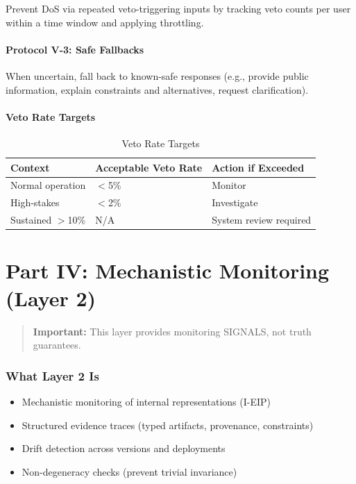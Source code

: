 \documentclass[11pt,letterpaper]{article}
\theoremstyle{definition}
\theoremstyle{remark}
\begin{document}
Prevent DoS via repeated veto-triggering inputs by tracking veto counts per user within a time window and applying throttling.

\subsection{Protocol V-3: Safe Fallbacks}

When uncertain, fall back to known-safe responses (e.g., provide public information, explain constraints and alternatives, request clarification).

\subsection{Veto Rate Targets}

\begin{table}[h]
\centering
\begin{tabular}{@{}lll@{}}
\toprule
\textbf{Context} & \textbf{Acceptable Veto Rate} & \textbf{Action if Exceeded} \\
\midrule
Normal operation & $<$5\% & Monitor \\
High-stakes & $<$2\% & Investigate \\
Sustained $>$10\% & N/A & System review required \\
\bottomrule
\end{tabular}
\caption{Veto Rate Targets}
\end{table}



\part*{Part IV: Mechanistic Monitoring (Layer 2)}

\begin{quote}
\textbf{Important:} This layer provides monitoring SIGNALS, not truth guarantees.
\end{quote}

\section{What Layer 2 Is}

\begin{itemize}
\item Mechanistic monitoring of internal representations (I-EIP)
\item Structured evidence traces (typed artifacts, provenance, constraints)
\item Drift detection across versions and deployments
\item Non-degeneracy checks (prevent trivial invariance)
\end{itemize}
\end{document}

